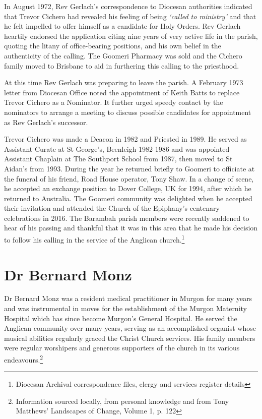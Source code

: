 In August 1972, Rev Gerlach's correspondence to Diocesan authorities indicated that Trevor Cichero had revealed his feeling of being \emph{`called to ministry'} and that he felt impelled to offer himself as a candidate for Holy Orders. Rev Gerlach heartily endorsed the application citing nine years of very active life in the parish, quoting the litany of office-bearing positions, and his own belief in the authenticity of the calling. The Goomeri Pharmacy was sold and the Cichero family moved to Brisbane to aid in furthering this calling to the priesthood.



At this time Rev Gerlach was preparing to leave the parish. A February 1973 letter from Diocesan Office noted the appointment of Keith Batts to replace Trevor Cichero as a Nominator. It further urged speedy contact by the nominators to arrange a meeting to discuss possible candidates for appointment as Rev Gerlach's successor.



Trevor Cichero was made a Deacon in 1982 and Priested in 1989. He served as Assistant Curate at St George's, Beenleigh 1982-1986 and was appointed Assistant Chaplain at The Southport School from 1987, then moved to St Aidan's from 1993. During the year he returned briefly to Goomeri to officiate at the funeral of his friend, Road House operator, Tony Shaw. In a change of scene, he accepted an exchange position to Dover College, UK for 1994, after which he returned to Australia. The Goomeri community was delighted when he accepted their invitation and attended the Church of the Epiphany's centenary celebrations in 2016. The Barambah parish members were recently saddened to hear of his passing and thankful that it was in this area that he made his decision to follow his calling in the service of the Anglican church.\footnote{Diocesan Archival correspondence files, clergy and services register details}


\section{Dr Bernard Monz}



Dr Bernard Monz was a resident medical practitioner in Murgon for many years and was instrumental in moves for the establishment of the Murgon Maternity Hospital which has since become Murgon's General Hospital. He served the Anglican community over many years, serving as an accomplished organist whose musical abilities regularly graced the Christ Church services. His family members were regular worshipers and generous supporters of the church in its various endeavours.\footnote{Information sourced locally, from personal knowledge and from Tony Matthews' Landscapes of Change, Volume 1, p. 122}








